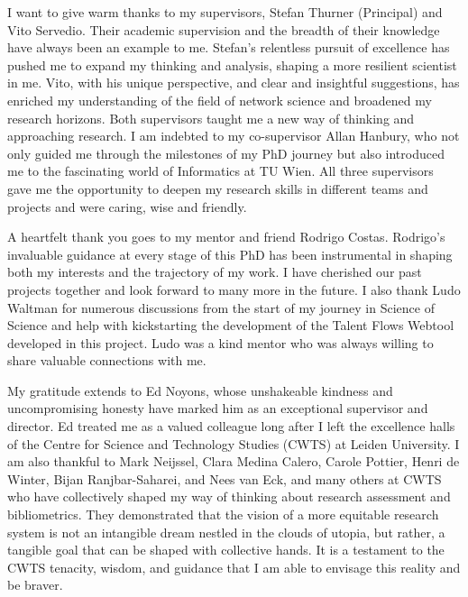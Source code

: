 \documentclass[draft,final]{vutinfth} %
\begin{document}
\frontmatter %

\addstatementpage


\begin{acknowledgements*}
I want to give warm thanks to my supervisors, Stefan Thurner (Principal) and Vito Servedio. Their  academic supervision and the breadth of their knowledge have always been an example to me. Stefan's relentless pursuit of excellence has pushed me to expand my thinking and analysis, shaping a more resilient scientist in me. Vito, with his unique perspective, and clear and insightful suggestions, has enriched my understanding of the field of network science and broadened my research horizons. Both supervisors taught me a new way of thinking and approaching research. I am indebted to my co-supervisor Allan Hanbury, who not only guided me through the milestones of my PhD journey but also introduced me to the fascinating world of Informatics at TU Wien. All three supervisors gave me the opportunity to deepen my research skills in different teams and projects and were caring, wise and friendly.

A heartfelt thank you goes to my mentor and friend Rodrigo Costas. Rodrigo's invaluable guidance at every stage of this PhD has been instrumental in shaping both my interests and the trajectory of my work. I have cherished our past projects together and look forward to many more in the future. I also thank Ludo Waltman for numerous discussions from the start of my journey in Science of Science and help with kickstarting the development of the Talent Flows Webtool developed in this project. Ludo was a kind mentor who was always willing to share valuable connections with me. 

My gratitude extends to Ed Noyons, whose unshakeable kindness and uncompromising honesty have marked him as an exceptional supervisor and director. Ed treated me as a valued colleague long after I left the excellence halls of the Centre for Science and Technology Studies (CWTS) at Leiden University. I am also thankful to Mark Neijssel, Clara Medina Calero, Carole Pottier, Henri de Winter, Bijan Ranjbar-Saharei, and Nees van Eck, and many others at CWTS who have collectively shaped my way of thinking about research assessment and bibliometrics. They demonstrated that the vision of a more equitable research system is not an intangible dream nestled in the clouds of utopia, but rather, a tangible goal that can be shaped with collective hands. It is a testament to the CWTS tenacity, wisdom, and guidance that I am able to envisage this reality and be braver.


\end{acknowledgements*}
\end{document}
